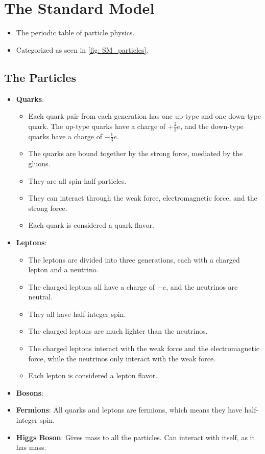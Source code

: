 \section{The Standard Model}
\begin{itemize}
    \item The periodic table of particle physics.
    \item Categorized as seen in \cref{fig: SM_particles}.
\end{itemize}

\subsection{The Particles}
\begin{itemize}
    \item \textbf{Quarks}: 
    \begin{itemize}
        \item Each quark pair from each generation has one up-type and one down-type quark. The up-type quarks have a charge of $+\frac{2}{3}e$, and the down-type quarks have a charge of $-\frac{1}{3}e$. 
        \item The quarks are bound together by the strong force, mediated by the gluons. 
        \item They are all spin-half particles.
        \item They can interact through the weak force, electromagnetic force, and the strong force.
        \item Each quark is considered a quark flavor.
    \end{itemize}
    \item \textbf{Leptons}:
    \begin{itemize}
        \item The leptons are divided into three generations, each with a charged lepton and a neutrino.
        \item The charged leptons all have a charge of $-e$, and the neutrinos are neutral.
        \item They all have half-integer spin.
        \item The charged leptons are much lighter than the neutrinos. 
        \item The charged leptons interact with the weak force and the electromagnetic force, while the neutrinos only interact with the weak force.
        \item Each lepton is considered a lepton flavor.
    \end{itemize}
    \item \textbf{Bosons}:
    \item \textbf{Fermions}: All quarks and leptons are fermions, which means they have half-integer spin.
    \item \textbf{Higgs Boson}: Gives mass to all the particles. Can interact with itself, as it has mass. 
\end{itemize}

